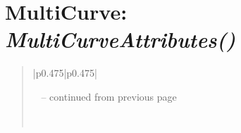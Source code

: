 \documentclass[letterpaper,10pt,english]{sphinxmanual}
\begin{document}
\section{\textbf{MultiCurve}: \emph{MultiCurveAttributes()}}
\label{attributes:multicurve-multicurveattributes}
\begin{DUlineblock}{0em}
\item[] 
\end{DUlineblock}
\begin{quote}

\begin{longtable}{|p{0.475\linewidth}|p{0.475\linewidth}|}
\hline
\endfirsthead

%
{{\textsf{\tablename\ \thetable{} -- continued from previous page}}} \\
\hline
\endhead

\hline {} \\ \hline
\endfoot

\endlastfoot



\end{longtable}
\end{quote}
\end{document}

